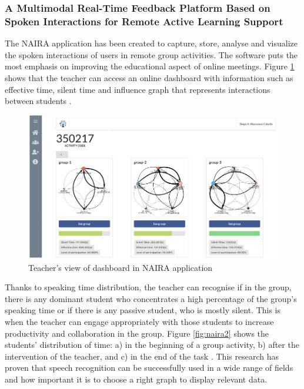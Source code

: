 \documentclass{article}
\begin{document}
\subsubsection{A Multimodal Real-Time Feedback Platform Based on Spoken Interactions for Remote Active Learning Support}
{\large 
The NAIRA application has been created to capture, store, analyse and visualize the spoken interactions of users in remote group activities. The software puts the most emphasis on improving the educational aspect of online meetings. Figure \ref{fig:naira} shows that the teacher can access an online dashboard with information such as effective time, silent time and influence graph that represents interactions between students \parencite{interactions}.\par
}

\begin{figure}[H]
  \centering
  \includegraphics[scale=0.6]{img/naira.png}
  \caption{Teacher's view of dashboard in NAIRA application}
  \label{fig:naira}
\end{figure}

{\large 
Thanks to speaking time distribution, the teacher can recognise if in the group, there is any dominant student who concentrates a high percentage of the group's speaking time or if there is any passive student, who is mostly silent. This is when the teacher can engage appropriately with those students to increase productivity and collaboration in the group. Figure \ref{fig:naira2} shows the students' distribution of time: a) in the beginning of a group activity, b) after the intervention of the teacher, and c) in the end of the task \parencite{interactions}. This research has proven that speech recognition can be successfully used in a wide range of fields and how important it is to choose a right graph to display relevant data.\par
}
\end{document}

